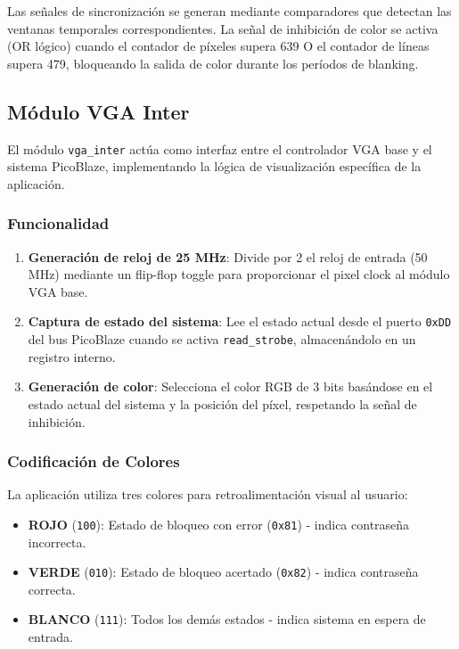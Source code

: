 \documentclass[a4paper, 12pt]{report}
\begin{document}
Las señales de sincronización se generan mediante comparadores que detectan las ventanas temporales correspondientes. La señal de inhibición de color se activa (OR lógico) cuando el contador de píxeles supera 639 O el contador de líneas supera 479, bloqueando la salida de color durante los períodos de blanking.

\subsection{Módulo VGA Inter}

El módulo \texttt{vga\_inter} actúa como interfaz entre el controlador VGA base y el sistema PicoBlaze, implementando la lógica de visualización específica de la aplicación.

\subsubsection{Funcionalidad}

\begin{enumerate}
    \item \textbf{Generación de reloj de 25 MHz}: Divide por 2 el reloj de entrada (50 MHz) mediante un flip-flop toggle para proporcionar el pixel clock al módulo VGA base.

    \item \textbf{Captura de estado del sistema}: Lee el estado actual desde el puerto \texttt{0xDD} del bus PicoBlaze cuando se activa \texttt{read\_strobe}, almacenándolo en un registro interno.

    \item \textbf{Generación de color}: Selecciona el color RGB de 3 bits basándose en el estado actual del sistema y la posición del píxel, respetando la señal de inhibición.
\end{enumerate}

\subsubsection{Codificación de Colores}

La aplicación utiliza tres colores para retroalimentación visual al usuario:

\begin{itemize}
    \item \textbf{ROJO} (\texttt{100}): Estado de bloqueo con error (\texttt{0x81}) - indica contraseña incorrecta.
    \item \textbf{VERDE} (\texttt{010}): Estado de bloqueo acertado (\texttt{0x82}) - indica contraseña correcta.
    \item \textbf{BLANCO} (\texttt{111}): Todos los demás estados - indica sistema en espera de entrada.
\end{itemize}
\end{document}

